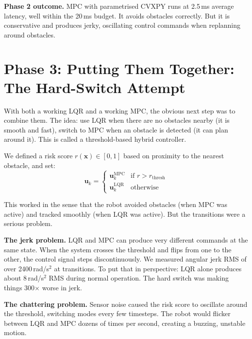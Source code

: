 \documentclass[12pt,a4paper]{article}
\begin{document}
\begin{successbox}
\textbf{Phase 2 outcome.} MPC with parametrised CVXPY runs at 2.5\,ms
average latency, well within the 20\,ms budget. It avoids obstacles
correctly. But it is conservative and produces jerky, oscillating control
commands when replanning around obstacles.
\end{successbox}

\section{Phase 3: Putting Them Together: The Hard-Switch Attempt}

With both a working LQR and a working MPC, the obvious next step was to
combine them. The idea: use LQR when there are no obstacles nearby (it is
smooth and fast), switch to MPC when an obstacle is detected (it can plan
around it). This is called a threshold-based hybrid controller.

We defined a risk score $r(\mathbf{x}) \in [0, 1]$ based on proximity
to the nearest obstacle, and set:
\[
  \mathbf{u}_k =
  \begin{cases}
    \mathbf{u}_k^{\text{MPC}} & \text{if } r > r_{\text{thresh}} \\
    \mathbf{u}_k^{\text{LQR}} & \text{otherwise}
  \end{cases}
\]

This worked in the sense that the robot avoided obstacles (when MPC was
active) and tracked smoothly (when LQR was active). But the transitions
were a serious problem.

\begin{failbox}
\textbf{The jerk problem.} LQR and MPC can produce very different commands
at the same state. When the system crosses the threshold and flips from
one to the other, the control signal steps discontinuously. We measured
angular jerk RMS of over 2400\,rad/s$^2$ at transitions. To put that in
perspective: LQR alone produces about 8\,rad/s$^2$ RMS during normal
operation. The hard switch was making things 300$\times$ worse in jerk.

\textbf{The chattering problem.} Sensor noise caused the risk score to
oscillate around the threshold, switching modes every few timesteps.
The robot would flicker between LQR and MPC dozens of times per second,
creating a buzzing, unstable motion.
\end{failbox}
\end{document}
